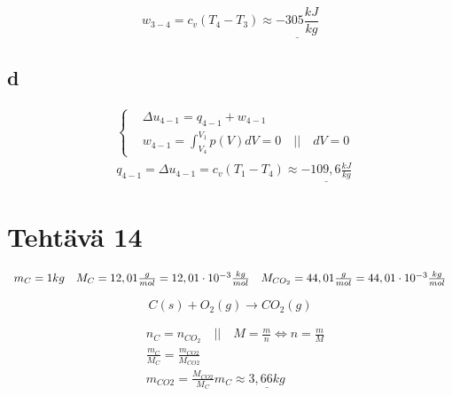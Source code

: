 \documentclass[12pt,a4paper,finnish]{article}
\begin{document}
\begin{equation}
 w_{3-4} = c_v(T_4 - T_3) \approx \underline{-305\frac{kJ}{kg}}
\end{equation}

\subsection{d}

\begin{align}
 &\left\{
 \begin{aligned}
  & \Delta u_{4-1} = q_{4-1} + w_{4-1}\\
  &w_{4-1} = \int_{V_4}^{V_1}p(V)dV = 0 \quad \bigg|\bigg| \quad dV = 0
 \end{aligned}\right.\\
 & q_{4-1} = \Delta u_{4-1} = c_v(T_1 - T_4) \approx \underline{-109,6\frac{kJ}{kg}}
\end{align}

\section{Tehtävä 14}

\begin{math}
 \begin{array}{l l l}
  m_C = 1 kg & M_C = 12,01 \frac{g}{mol} = 12,01\cdot 10^{-3} \frac{kg}{mol} & M_{CO_2} = 44,01 \frac{g}{mol} = 44,01\cdot 10^{-3} \frac{kg}{mol}\\
 \end{array}
\end{math}

\begin{equation}
 C(s) + O_2(g) \rightarrow CO_2(g)
\end{equation}

\begin{align}
 &n_C = n_{CO_2} \quad \bigg|\bigg| \quad M = \frac{m}{n} \Leftrightarrow n = \frac{m}{M}\\ 
 &\frac{m_C}{M_C} = \frac{m_{CO2}}{M_{CO2}}\\
 &m_{CO2} = \frac{M_{CO2}}{M_C}m_C \approx \underline{3,66 kg}
\end{align}
\end{document}
